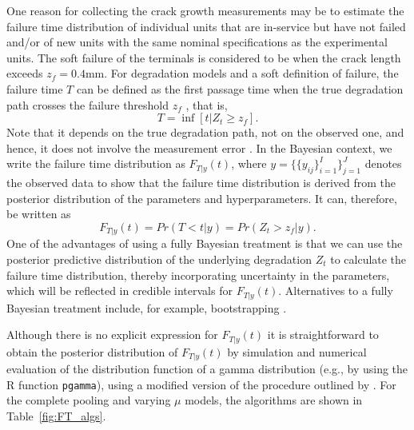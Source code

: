 One reason for collecting the crack growth measurements may be to estimate the failure time distribution of individual units that are in-service but have not failed and/or of new units with the same nominal specifications as the experimental units. The soft failure of the terminals is considered to be when the crack length exceeds $z_f = 0.4$mm. For degradation models and a soft definition of failure, the failure time $T$ can be defined as the first passage time when the true degradation path crosses the failure threshold $z_f$ \citep{balakrishnan_2017}, that is,
$$
T = \inf\left[ t|Z_t \geq z_f \right].
$$
Note that it depends on the true degradation path, not on the observed one, and hence, it does not involve the measurement error \citep{hamada_2008}. In the Bayesian context, we write the failure time distribution as $F_{T|y}(t)$, where $y = \{\{y_{ij}\}^I_{i = 1}\}^J_{j = 1}$ denotes the observed data to show that the failure time distribution is derived from the posterior distribution of the parameters and hyperparameters. It can, therefore, be written as
$$
F_{T|y}(t) = Pr(T < t | y) = Pr(Z_t > z_f | y).
$$
One of the advantages of using a fully Bayesian treatment is that we can use the posterior predictive distribution of the underlying degradation $Z_t$ to calculate the failure time distribution, thereby incorporating uncertainty in the parameters, which will be reflected in credible intervals for $F_{T|y}(t)$. Alternatives to a fully Bayesian treatment include, for example, bootstrapping \citep{peng_2018}.

Although there is no explicit expression for $F_{T|y}(t)$ it is straightforward to obtain the posterior distribution of $F_{T|y}(t)$ by simulation and numerical evaluation of the distribution function of a gamma distribution (e.g., by using the R function \texttt{pgamma}), using a modified version of the procedure outlined by \citet[Sec.~8.2.1]{hamada_2008}. For the complete pooling and varying $\mu$ models, the algorithms are shown in Table~\ref{fig:FT_algs}.

